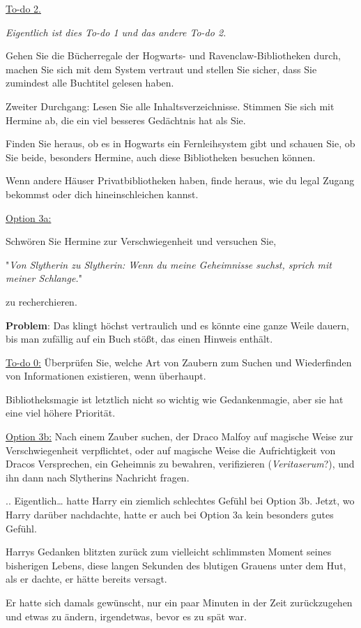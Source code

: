 {\uline{To-do 2.}

\emph{Eigentlich ist dies To-do 1 und das andere To-do 2.}

Gehen Sie die Bücherregale der Hogwarts- und Ravenclaw-Bibliotheken durch, machen Sie sich mit dem System vertraut und stellen Sie sicher, dass Sie zumindest alle Buchtitel gelesen haben.

Zweiter Durchgang: Lesen Sie alle Inhaltsverzeichnisse. Stimmen Sie sich mit Hermine ab, die ein viel besseres Gedächtnis hat als Sie.

Finden Sie heraus, ob es in Hogwarts ein Fernleihsystem gibt und schauen Sie, ob Sie beide, besonders Hermine, auch diese Bibliotheken besuchen können.

Wenn andere Häuser Privatbibliotheken haben, finde heraus, wie du legal Zugang bekommst oder dich hineinschleichen kannst.

\uline{Option 3a:}

Schwören Sie Hermine zur Verschwiegenheit und versuchen Sie,

"\emph{Von Slytherin zu Slytherin: Wenn du meine Geheimnisse suchst, sprich mit meiner Schlange.}"

zu recherchieren.

\textbf{Problem}: Das klingt höchst vertraulich und es könnte eine ganze Weile dauern, bis man zufällig auf ein Buch stößt, das einen Hinweis enthält.

\uline{To-do 0:} Überprüfen Sie, welche Art von Zaubern zum Suchen und Wiederfinden von Informationen existieren, wenn überhaupt.

Bibliotheksmagie ist letztlich nicht so wichtig wie Gedankenmagie, aber sie hat eine viel höhere Priorität.

\uline{Option 3b:} Nach einem Zauber suchen, der Draco Malfoy auf magische Weise zur Verschwiegenheit verpflichtet, oder auf magische Weise die Aufrichtigkeit von Dracos Versprechen, ein Geheimnis zu bewahren, verifizieren (\emph{Veritaserum}?), und ihn dann nach Slytherins Nachricht fragen.

.. Eigentlich… hatte Harry ein ziemlich schlechtes Gefühl bei Option 3b. Jetzt, wo Harry darüber nachdachte, hatte er auch bei Option 3a kein besonders gutes Gefühl.

Harrys Gedanken blitzten zurück zum vielleicht schlimmsten Moment seines bisherigen Lebens, diese langen Sekunden des blutigen Grauens unter dem Hut, als er dachte, er hätte bereits versagt.

Er hatte sich damals gewünscht, nur ein paar Minuten in der Zeit zurückzugehen und etwas zu ändern, irgendetwas, bevor es zu spät war.

}
